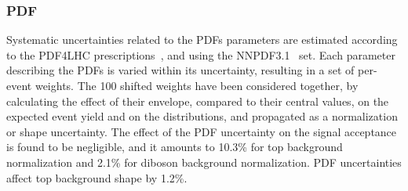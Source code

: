 \subsubsection{PDF}

Systematic uncertainties related to the PDFs parameters are estimated according to the PDF4LHC prescriptions~\cite{Butterworth:2015oua}, and using the NNPDF3.1~\cite{Ball:2017nwa} set. Each parameter describing the PDFs is varied within its uncertainty, resulting in a set of per-event weights. The 100 shifted weights have been considered together, by calculating the effect of their envelope, compared to their central values, on the expected event yield and on the \mtVZ distributions, and propagated as a normalization or shape uncertainty. The effect of the PDF uncertainty on the signal acceptance is found to be negligible, and it amounts to 10.3\% for top background normalization and 2.1\% for diboson background normalization. PDF uncertainties affect top background shape by 1.2\%.

